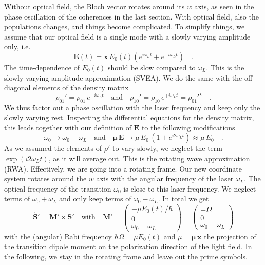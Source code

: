 Without optical field, the Bloch vector rotates around its $w$ axis, as seen in the phase oscillation of the coherences in the last section. With optical field, also the populations changes, and things become complicated.
To simplify things, we assume that our optical field is a single mode with a slowly varying amplitude only, i.e.
\begin{equation}
 \boldsymbol{E}(t) = \boldsymbol{x} \, E_0(t) \left( e^{i \omega_L t} + e^{-i \omega_L t} \right) \quad .
\end{equation}
The time-dependence of $E_0(t)$ should be slow compared to $\omega_L$. This is the slowly varying amplitude approximation (SVEA). We do the same with the off-diagonal elements of the density matrix
\begin{equation}
 \rho_{01}' = \rho_{01} \, e^{-i \omega_L t}  \quad \text{and} \quad
 \rho_{10}' = \rho_{10} \, e^{+i \omega_L t} = \rho_{01}'^\star \quad .
\end{equation}
We thus factor out a phase oscillation with the laser frequency and keep only the slowly varying rest. Inspecting the differential equations for the density matrix, this leads together with our definition of $\boldsymbol{E}$ to the following modifications
\begin{equation}
 \omega_0 \rightarrow \omega_0 - \omega_L \quad \text{and} \quad 
 \boldsymbol{\mu} \, \boldsymbol{E}  \rightarrow \mu \, E_0  \, ( 1+ e^{i 2\omega_L t} ) \approx \mu \, E_0  \quad .
\end{equation}
As we assumed the elements of $\rho'$ to vary slowly, we neglect the term $\exp(i 2 \omega_L t)$, as it will average out.  This is the rotating wave approximation (RWA). Effectively, we are going into a 
rotating frame. Our new coordinate system rotates around the $w$ axis with the angular frequency of the laser $\omega_L$. The optical frequency of the transition $\omega_0$ is close to this laser frequency. We neglect terms of $\omega_0 + \omega_L$ and only keep terms of  $\omega_0 - \omega_L$. In total we get
\begin{equation}
 \dot{\boldsymbol{S}'} = \boldsymbol{M}'   \times \boldsymbol{S}' 
 \quad \text{with} \quad 
 \boldsymbol{M}'  = 
 \begin{pmatrix}
- \mu    E_0(t) / \hbar \\
0 \\
\omega_0 - \omega_L
 \end{pmatrix} = 
  \begin{pmatrix}
- \Omega \\
0 \\
\omega_0 - \omega_L
 \end{pmatrix}  \label{eq:rabi_bloch_vector_RWA}
\end{equation}
with the (angular) Rabi frequency $\hbar \Omega = \mu    E_0(t) $ and $\mu = \boldsymbol{\mu \, x}$ the projection of the transition dipole moment on the polarization direction of the light field. In the following, we stay in the rotating frame and leave out the prime symbols.



